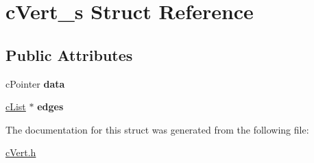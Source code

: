 \hypertarget{structcVert__s}{}\section{c\+Vert\+\_\+s Struct Reference}
\label{structcVert__s}
\subsection*{Public Attributes}
\begin{DoxyCompactItemize}
\item 
\mbox{\label{structcVert__s_aae49e7abf44721e44fd1ab4e1b193576}} 
c\+Pointer {\bfseries data}
\item 
\mbox{\label{structcVert__s_a3fdb83e60774d836ca9d0b92e4672fd6}} 
\mbox{\hyperlink{structcList}{c\+List}} $\ast$ {\bfseries edges}
\end{DoxyCompactItemize}


The documentation for this struct was generated from the following file\+:\begin{DoxyCompactItemize}
\item 
\mbox{\hyperlink{cVert_8h}{c\+Vert.\+h}}\end{DoxyCompactItemize}

